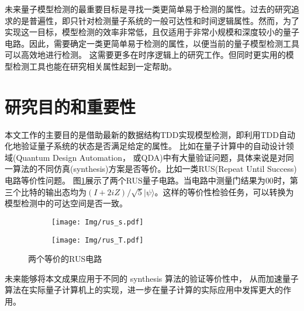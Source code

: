 未来量子模型检测的最重要目标是寻找一类更简单易于检测的属性。过去的研究追求的是普遍性，即只针对检测量子系统的一般可达性和时间逻辑属性。然而，为了实现这一目标，模型检测的效率非常低，且仅适用于非常小规模和深度较小的量子电路。因此，需要确定一类更简单易于检测的属性，以便当前的量子模型检测工具可以高效地进行检测\citep{ying2021model}。
这需要更多在时序逻辑上的研究工作。但同时更实用的模型检测工具也能在研究相关属性起到一定帮助。




\section{研究目的和重要性}
本文工作的主要目的是借助最新的数据结构TDD实现模型检测，即利用TDD自动化地验证量子系统的状态是否满足给定的属性。
比如在量子计算中的自动设计领域(Quantum Design Automation， 或QDA)中有大量验证问题，具体来说是对同一算法的不同仿真(synthesis)方案是否等价。比如一类RUS(Repeat Until Success)电路等价性问题。
图\ref{fig:rus-equal}展示了两个RUS量子电路。当电路中测量门结果为$00$时，第三个比特的输出态均为$\left(I+2iZ\right)/ \sqrt 5 |\psi\rangle$。这样的等价性检验任务，可以转换为模型检测中的可达空间是否一致。
\begin{figure}[!htbp]
	\centering
	\begin{subfigure}[b]{0.4\textwidth}
        \centering
        \texttt{[image: Img/rus\_s.pdf]}
	\end{subfigure}
	\qquad
	\begin{subfigure}[b]{0.4\textwidth}
        \centering
        \texttt{[image: Img/rus\_T.pdf]}
	\end{subfigure}
	\caption{两个等价的RUS电路\citep{Bocharov_2015}}
	\label{fig:rus-equal}
\end{figure}
未来能够将本文成果应用于不同的 synthesis 算法的验证等价性中，
从而加速量子算法在实际量子计算机上的实现，进一步在量子计算的实际应用中发挥更大的作用。
